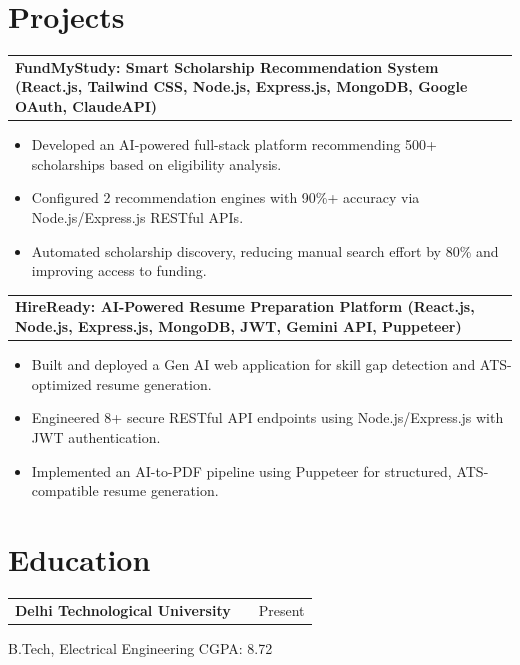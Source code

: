 \documentclass[a4paper,10pt]{article}
\makeatletter
\newenvironment{jobshort}[2]
    {
    \begin{tabularx}{\linewidth}{@{}l X r@{}}
    \textbf{#1} & \hfill &  #2 \\[3.75pt]
    \end{tabularx}
    }
    {
    }
\newenvironment{joblong}[2]
    {
    \begin{tabularx}{\linewidth}{@{}l X r@{}}
    \textbf{#1} & \hfill &  #2 \\[3.75pt]
    \end{tabularx}
    \begin{minipage}[t]{\linewidth}
    \begin{itemize}[nosep,after=\strut, leftmargin=1em, itemsep=3pt,label=--]
    }
    {
    \end{itemize}
    \end{minipage}    
    }
\makeatother
\begin{document}
\section{Projects}


\begin{joblong}{FundMyStudy: Smart Scholarship Recommendation System (React.js, Tailwind CSS, Node.js, Express.js, MongoDB, Google OAuth, ClaudeAPI)}{}
\item Developed an AI-powered full-stack platform recommending 500+ scholarships based on eligibility analysis.
\item Configured 2 recommendation engines with 90\%+ accuracy via Node.js/Express.js RESTful APIs.
\item Automated scholarship discovery, reducing manual search effort by 80\% and improving access to funding.
\end{joblong}
\vspace{3pt}


\begin{joblong}{HireReady: AI-Powered Resume Preparation Platform (React.js, Node.js, Express.js, MongoDB, JWT, Gemini API, Puppeteer)}{}
\item Built and deployed a Gen AI web application for skill gap detection and ATS-optimized resume generation.
\item Engineered 8+ secure RESTful API endpoints using Node.js/Express.js with JWT authentication.
\item Implemented an AI-to-PDF pipeline using Puppeteer for structured, ATS-compatible resume generation.
\end{joblong}
\vspace{3pt}


\section{Education}


\begin{jobshort}{Delhi Technological University}{Present}
\end{jobshort}
B.Tech, Electrical Engineering \hfill CGPA: 8.72\\[6pt]
\end{document}

